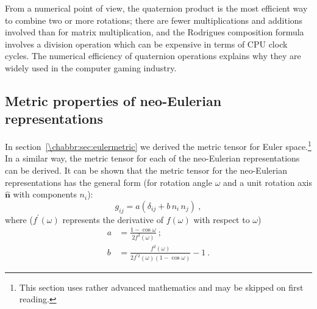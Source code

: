 From a numerical point of view, the quaternion product is the most efficient way to combine two or more rotations; there are fewer multiplications and additions involved than for matrix multiplication, and the Rodrigues composition formula involves a division operation which can be expensive in terms of CPU clock cycles.  The numerical efficiency of quaternion operations explains why they are widely used in the computer gaming industry.


\subsection{Metric properties of neo-Eulerian representations}\label{\chabbr:ssec:neoEulerianmetric}
In section~\ref{\chabbr:sec:eulermetric} we derived the metric tensor for Euler space.\footnote{This section uses rather advanced mathematics and may be skipped on first reading.} In a similar way, the metric tensor for each of the neo-Eulerian representations can be derived. It can be shown \cite{kumar1998a} that the metric tensor for the neo-Eulerian representations has the general form (for rotation angle $\omega$ and a unit rotation axis $\hat{\mathbf{n}}$ with components $n_i$):
\begin{equation}
	g_{ij} = a\left(\delta_{ij}+b\,n_i\,n_j\right)\ ,
\end{equation}
where ($f^{\prime}(\omega)$ represents the derivative of $f(\omega)$ with respect to $\omega$)
\begin{equation}
\begin{split}
	a &= \frac{1-\cos\omega}{2f^2(\omega)}\ ;\\
	b &= \frac{f^2(\omega)}{2f^{\prime 2}(\omega)(1-\cos\omega)}-1\ .
\end{split}
\end{equation}

